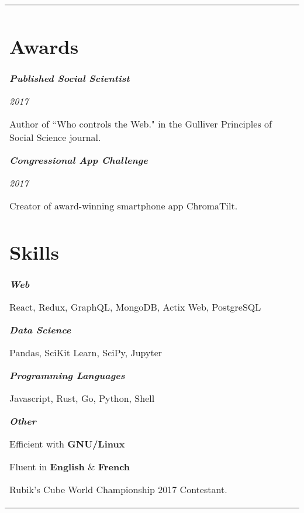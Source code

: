 \documentclass[12pt]{article}
\newcommand{\medtitle}[3]{
   \textbf{\textit{#1}}

   {\it #2} %

   \smallskip

   {#3} %

   \medskip
}
\newcommand{\smalltitle}[2]{
   \textbf{\textit{#1}}

   #2

   \medskip
}
\begin{document}
\begin{tabularx}{\textwidth}{LS}
      \section{Awards}

      \medtitle{Published Social Scientist}{2017}{
         Author of ``Who controls the Web." in the Gulliver Principles of Social
         Science journal.
      }

      \medtitle{Congressional App Challenge}{2017}{
         Creator of award-winning smartphone app ChromaTilt.
      }

      \section{Skills}

      \smalltitle{Web}{
         React, Redux, GraphQL, MongoDB, Actix Web, PostgreSQL
      }

      \smalltitle{Data Science}{
         Pandas, SciKit Learn, SciPy, Jupyter
      }

      \smalltitle{Programming Languages}{
         Javascript, Rust, Go, Python, Shell
      }

      \smalltitle{Other}{
         Efficient with {\bf GNU/Linux}

         Fluent in {\bf English} \& {\bf French}

         Rubik's Cube World Championship 2017 Contestant.
      }
   \end{tabularx}
\end{document}
